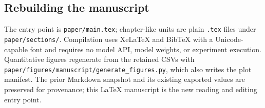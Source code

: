 \subsection{Rebuilding the manuscript}

The entry point is \texttt{paper/main.tex}; chapter-like units are plain \texttt{.tex} files under
\texttt{paper/sections/}. Compilation uses XeLaTeX and BibTeX with a Unicode-capable font and requires no
model API, model weights, or experiment execution. Quantitative figures regenerate from the retained CSVs
with \texttt{paper/figures/manuscript/generate\_figures.py}, which also writes the plot manifest. The prior
Markdown snapshot and its existing exported values are preserved for provenance; this LaTeX manuscript is
the new reading and editing entry point.
